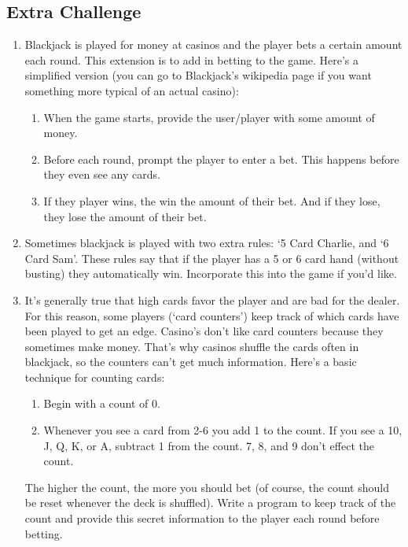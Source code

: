 \documentclass{hitec}
\begin{document}
\subsection{Extra Challenge}
\begin{enumerate}
	\item Blackjack is played for money at casinos and the player bets a certain amount each round. This extension is to add in betting to the game. Here's a simplified version (you can go to Blackjack's wikipedia page if you want something more typical of an actual casino):
		\begin{enumerate}
		\item When the game starts, provide the user/player with some amount of money.
		\item Before each round, prompt the player to enter a bet. This happens before they even see any cards.
		\item If they player wins, the win the amount of their bet. And if they lose, they lose the amount of their bet.
		\end{enumerate}
	\item Sometimes blackjack is played with two extra rules: `5 Card Charlie, and `6 Card Sam'. These rules say that if the player has a 5 or 6 card hand (without busting) they automatically win. Incorporate this into the game if you'd like.
	\item It's generally true that high cards favor the player and are bad for the dealer. For this reason, some players (`card counters') keep track of which cards have been played to get an edge. Casino's don't like card counters because they sometimes make money. That's why casinos shuffle the cards often in blackjack, so the counters can't get much information. Here's a basic technique for counting cards:
		\begin{enumerate}
		\item Begin with a count of 0.
		\item Whenever you see a card from 2-6 you add 1 to the count. If you see a 10, J, Q, K, or A, subtract 1 from the count. 7, 8, and 9 don't effect the count.
		\end{enumerate}
		The higher the count, the more you should bet (of course, the count should be reset whenever the deck is shuffled). Write a program to keep track of the count and provide this secret information to the player each round before betting.
\end{enumerate}
		
\end{document}
